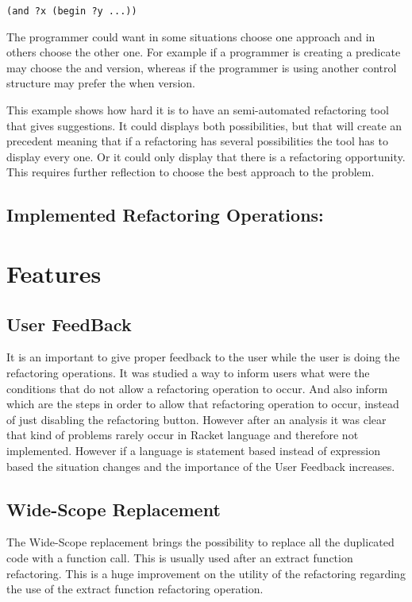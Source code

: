\begin{lstlisting}[caption="Example"]
(and ?x (begin ?y ...))
\end{lstlisting}

The programmer could want in some situations choose one approach and in others
choose the other one. For example if a programmer is creating a predicate may
choose the and version, whereas if the programmer is using another control structure
may prefer the when version.

This example shows how hard it is to have an semi-automated refactoring tool
that gives suggestions.
It could displays both possibilities, but that will create an precedent meaning
that if a refactoring has several possibilities the tool has to display every one.
Or it could only display that there is a refactoring opportunity.
This requires further reflection to choose the best approach to the problem.


\subsection{Implemented Refactoring Operations:}

\section{Features}

\subsection{User FeedBack}
It is an important to give proper feedback to the user while the user is doing
the refactoring operations.
It was studied a way to inform users what were the conditions that do not allow
a refactoring operation to occur.
And also inform which are the steps in order to allow that refactoring operation to occur,
instead of just disabling the refactoring button.
However after an analysis it was clear that kind of problems rarely occur
in Racket language and therefore not implemented.
However if a language is statement based instead of expression based the situation changes
and the importance of the User Feedback increases.


\subsection{Wide-Scope Replacement} %
The Wide-Scope replacement brings the possibility to replace all the duplicated
code with a function call. This is usually used after an extract function refactoring.
This is a huge improvement on the utility of the refactoring regarding the use
of the extract function refactoring operation.

